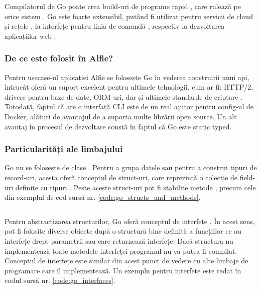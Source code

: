 Compilatorul de Go poate crea build-uri de programe rapid \cite{goCLIs}, care rulează pe orice sistem \cite{goReleases}. Go este foarte extensibil, putând fi utilizat pentru servicii de cloud și rețele \cite{goCloud}, la interfețe pentru linia de comandă \cite{goCLIs}, respectiv la dezvoltarea aplicațiilor web \cite{goWebDev}.

\subsubsection{De ce este folosit în Alfie?}

Pentru usecase-ul aplicației Alfie se folosește Go în vederea construirii unui api, întrucât oferă un suport excelent pentru ultimele tehnologii, cum ar fi: HTTP/2, drivere pentru baze de date, ORM-uri, dar și ultimele standarde de criptare \cite{goWebDev}. Totodată, faptul că are o interfață CLI este de un real ajutor pentru config-ul de Docker, alături de avantajul de a suporta multe librării open source. Un alt avantaj în procesul de dezvoltare constă în faptul că Go este static typed.

\subsubsection{Particularități ale limbajului}

Go nu se folosește de clase \cite{goByExample}. Pentru a grupa datele sau pentru a construi tipuri de record-uri, acesta oferă conceptul de struct-uri, care reprezintă o colecție de field-uri definite cu tipuri \cite{goByExampleStructs}. Peste aceste struct-uri pot fi stabilite metode \cite{goByExampleMethods}, precum cele din exemplul de cod sursă nr. \ref{code:go_structs_and_methods}.

\begin{code}
    \inputminted[frame=single,framesep=2mm,linenos,breaklines,tabsize=2]{go}{code/go-structs.go}
    \label{code:go_structs_and_methods}
\end{code}

Pentru abstractizarea structurilor, Go oferă conceptul de interfețe \cite{goByExampleInterfaces}. În acest sens, pot fi folosite diverse obiecte după o structură bine definită a funcțiilor ce au interfețe drept parametrii sau care returnează interfețe. Dacă structura nu implementează toate metodele interfeței programul nu va putea fi compilat. Conceptul de interfețe este similar din acest punct de vedere cu alte limbaje de programare care îl implementează. Un exemplu pentru interfețe este redat în codul sursă nr. \ref{code:go_interfaces}.

